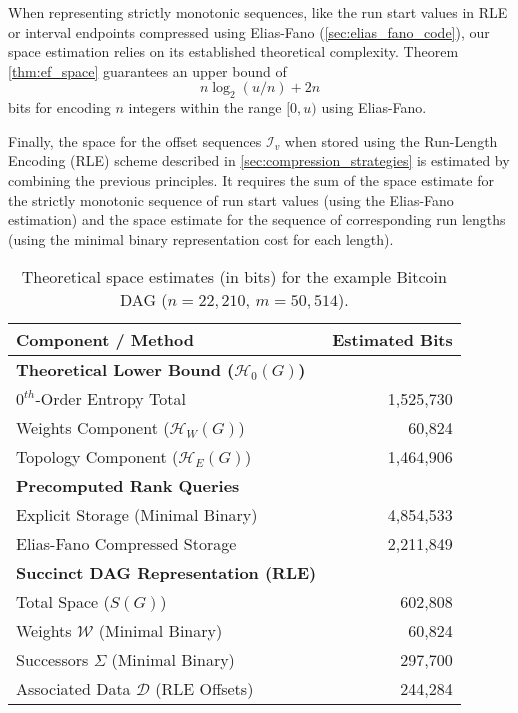 When representing strictly monotonic sequences, like the run start values in RLE or interval endpoints compressed using Elias-Fano (\autoref{sec:elias_fano_code}), our space estimation relies on its established theoretical complexity. Theorem \ref{thm:ef_space} guarantees an upper bound of
\[n \log_2(u/n) + 2n\]
bits for encoding $n$ integers within the range $[0, u)$ using Elias-Fano.

Finally, the space for the offset sequences $\mathcal{I}_v$ when stored using the Run-Length Encoding (RLE) scheme described in \autoref{sec:compression_strategies} is estimated by combining the previous principles. It requires the sum of the space estimate for the strictly monotonic sequence of run start values (using the Elias-Fano estimation) and the space estimate for the sequence of corresponding run lengths (using the minimal binary representation cost for each length).

\begin{table}[htbp]
    \centering
    \small
    \begin{tabular}{l r}
        \toprule
        Component / Method                                      & Estimated Bits \\
        \midrule
        \textbf{Theoretical Lower Bound ($\mathcal{H}_0(G)$)}   &                \\
        \quad $0^{th}$-Order Entropy Total                      & 1,525,730      \\
        \quad \quad Weights Component ($\mathcal{H}_W(G)$)      & 60,824         \\
        \quad \quad Topology Component ($\mathcal{H}_E(G)$)     & 1,464,906      \\
        \midrule
        \textbf{Precomputed Rank Queries}                       &                \\
        \quad Explicit Storage (Minimal Binary)                 & 4,854,533      \\
        \quad Elias-Fano Compressed Storage                     & 2,211,849      \\
        \midrule
        \textbf{Succinct DAG Representation (RLE)}              &                \\
        \quad Total Space ($S(G)$)                              & 602,808        \\
        \quad \quad Weights $\mathcal{W}$ (Minimal Binary)      & 60,824         \\
        \quad \quad Successors $\Sigma$ (Minimal Binary)        & 297,700        \\
        \quad \quad Associated Data $\mathcal{D}$ (RLE Offsets) & 244,284        \\
        \bottomrule
    \end{tabular}
    \caption{Theoretical space estimates (in bits) for the example Bitcoin DAG ($n=22,210$, $m=50,514$).}
    \label{tab:space_estimates_bitcoin}
\end{table}

